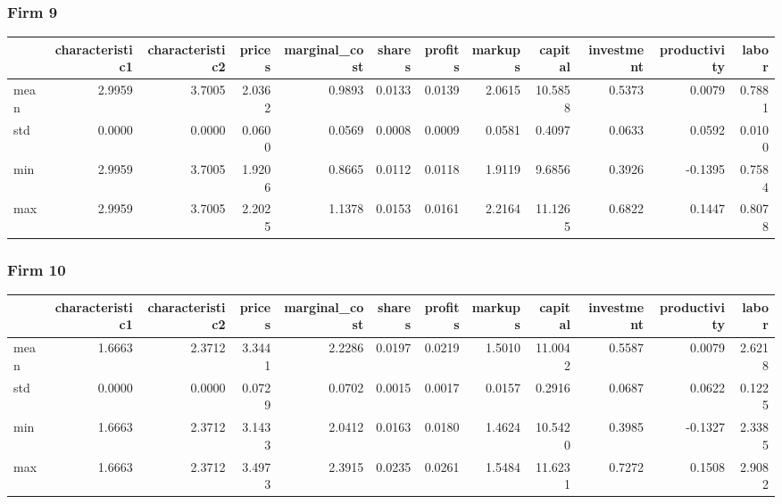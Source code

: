  \subsubsection*{Firm 9}
\begin{tabular}{lrrrrrrrrrrr}
\toprule
{} &  characteristic1 &  characteristic2 &  prices &  marginal\_cost &  shares &  profits &  markups &  capital &  investment &  productivity &  labor \\
\midrule
mean &           2.9959 &           3.7005 &  2.0362 &         0.9893 &  0.0133 &   0.0139 &   2.0615 &  10.5858 &      0.5373 &        0.0079 & 0.7881 \\
std  &           0.0000 &           0.0000 &  0.0600 &         0.0569 &  0.0008 &   0.0009 &   0.0581 &   0.4097 &      0.0633 &        0.0592 & 0.0100 \\
min  &           2.9959 &           3.7005 &  1.9206 &         0.8665 &  0.0112 &   0.0118 &   1.9119 &   9.6856 &      0.3926 &       -0.1395 & 0.7584 \\
max  &           2.9959 &           3.7005 &  2.2025 &         1.1378 &  0.0153 &   0.0161 &   2.2164 &  11.1265 &      0.6822 &        0.1447 & 0.8078 \\
\bottomrule
\end{tabular}


 \subsubsection*{Firm 10}
\begin{tabular}{lrrrrrrrrrrr}
\toprule
{} &  characteristic1 &  characteristic2 &  prices &  marginal\_cost &  shares &  profits &  markups &  capital &  investment &  productivity &  labor \\
\midrule
mean &           1.6663 &           2.3712 &  3.3441 &         2.2286 &  0.0197 &   0.0219 &   1.5010 &  11.0042 &      0.5587 &        0.0079 & 2.6218 \\
std  &           0.0000 &           0.0000 &  0.0729 &         0.0702 &  0.0015 &   0.0017 &   0.0157 &   0.2916 &      0.0687 &        0.0622 & 0.1225 \\
min  &           1.6663 &           2.3712 &  3.1433 &         2.0412 &  0.0163 &   0.0180 &   1.4624 &  10.5420 &      0.3985 &       -0.1327 & 2.3385 \\
max  &           1.6663 &           2.3712 &  3.4973 &         2.3915 &  0.0235 &   0.0261 &   1.5484 &  11.6231 &      0.7272 &        0.1508 & 2.9082 \\
\bottomrule
\end{tabular}


